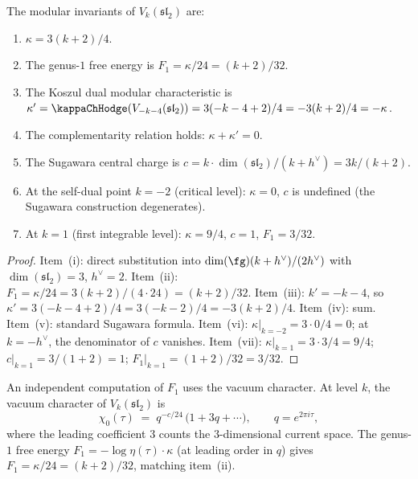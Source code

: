 \begin{proposition}
\label{prop:benchmark-modular-data}
The modular invariants of $V_k(\mathfrak{sl}_2)$ are:
\begin{enumerate}[label=\textup{(\roman*)},nosep]
\item $\kappa = 3(k+2)/4$.
\item The genus-$1$ free energy is
 $F_1 = \kappa/24 = (k+2)/32$.
\item The Koszul dual modular characteristic is
 $\kappa' = \kappaChHodge(V_{-k-4}(\mathfrak{sl}_2))
 = 3(-k - 4 + 2)/4
 = -3(k+2)/4 = -\kappa$.
\item The complementarity relation holds:
 $\kappa + \kappa' = 0$.
\item The Sugawara central charge is
 $c = k \cdot \dim(\mathfrak{sl}_2)/(k + h^\vee)
 = 3k/(k+2)$.
\item At the self-dual point $k = -2$
 \textup{(}critical level\textup{)}:
 $\kappa = 0$, $c$ is undefined
 \textup{(}the Sugawara construction degenerates\textup{)}.
\item At $k = 1$ \textup{(}first integrable level\textup{)}:
 $\kappa = 9/4$, $c = 1$, $F_1 = 3/32$.
\end{enumerate}
\end{proposition}

\begin{proof}
Item~(i): direct substitution into
$\dim(\fg)(k+h^\vee)/(2h^\vee)$ with
$\dim(\mathfrak{sl}_2) = 3$, $h^\vee = 2$.
Item~(ii): $F_1 = \kappa/24 = 3(k+2)/(4 \cdot 24) = (k+2)/32$.
Item~(iii): $k' = -k-4$, so $\kappa' = 3(-k-4+2)/4 = 3(-k-2)/4
= -3(k+2)/4$.
Item~(iv): sum.
Item~(v): standard Sugawara formula.
Item~(vi): $\kappa|_{k=-2} = 3 \cdot 0/4 = 0$;
at $k = -h^\vee$, the denominator of $c$ vanishes.
Item~(vii): $\kappa|_{k=1} = 3 \cdot 3/4 = 9/4$;
$c|_{k=1} = 3/(1+2) = 1$;
$F_1|_{k=1} = (1+2)/32 = 3/32$.
\end{proof}

\begin{remark}
\label{rem:benchmark-f1-character}
An independent computation of $F_1$ uses the vacuum character.
At level $k$, the vacuum character of $V_k(\mathfrak{sl}_2)$ is
\[
 \chi_0(\tau)
 \;=\;
 q^{-c/24}\,\bigl(1 + 3q + \cdots\bigr),
 \qquad q = e^{2\pi i \tau},
\]
where the leading coefficient $3$ counts the $3$-dimensional
current space. The genus-$1$ free energy $F_1 = -\log\eta(\tau)
\cdot \kappa$ (at leading order in $q$) gives
$F_1 = \kappa/24 = (k+2)/32$, matching item~(ii).
\end{remark}


